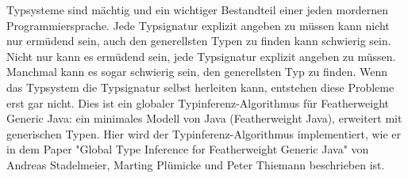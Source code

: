 Typsysteme sind mächtig und ein wichtiger Bestandteil einer jeden mordernen Programmiersprache.
Jede Typsignatur explizit angeben zu müssen kann nicht nur ermüdend sein, auch den generellsten Typen zu finden kann schwierig sein.
Nicht nur kann es ermüdend sein, jede Typsignatur explizit angeben zu müssen. Manchmal kann es sogar schwierig sein, den generellsten Typ zu finden.
Wenn das Typsystem die Typsignatur selbst herleiten kann, entstehen diese Probleme erst gar nicht.
Dies ist ein globaler Typinferenz-Algorithmus für Featherweight Generic Java: ein minimales Modell von Java (Featherweight Java), erweitert mit generischen Typen.
Hier wird der Typinferenz-Algorithmus implementiert, wie er in dem Paper "Global Type Inference for Featherweight Generic Java" von Andreas Stadelmeier, Marting Plümicke und Peter Thiemann beschrieben ist.
